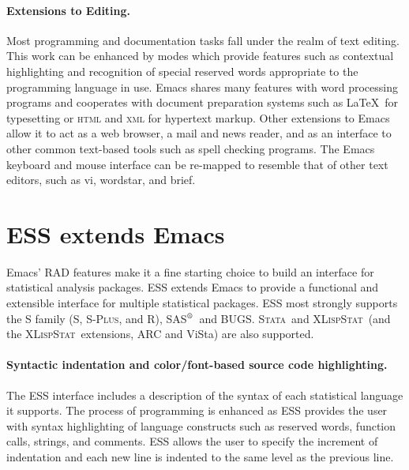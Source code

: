 \documentclass{article}
\newcommand*{\SAS}{\textsc{SAS}$^{\mbox{\scriptsize\textregistered}}$}
\newcommand*{\Splus}{\textsc{S-Plus}}
\newcommand*{\XLispStat}{\textsc{XLispStat}}
\newcommand*{\Stata}{\textsc{Stata}}
\begin{document}
\paragraph{Extensions to Editing.}
Most programming and documentation tasks fall under the realm of text
editing.  This work can be enhanced by modes which provide features such
as contextual highlighting and recognition of special reserved words
appropriate to the programming language in use.  
Emacs shares many features with word processing
programs and cooperates with document preparation systems
such as \LaTeX\ for typesetting or \textsc{html} and \textsc{xml}
for hypertext markup.
Other extensions to Emacs allow it to act as a web browser, a mail and news
reader, and as an interface to
other common text-based tools such as spell checking programs.  The
Emacs keyboard and mouse interface can be re-mapped to resemble that
of other text editors, such as vi, wordstar, and brief.


\section{ESS extends Emacs}
\label{sec:ess-extends-emacs}

Emacs' RAD features make it a fine starting choice to
build an interface for statistical analysis packages.  ESS extends
Emacs to provide a functional and extensible interface
for multiple statistical packages. 
ESS most strongly supports the S family (S, \Splus, and R), \SAS\ and BUGS.  
\Stata\ and \XLispStat\ (and the \XLispStat\ extensions, ARC and ViSta) are
also supported.

\paragraph{Syntactic indentation and color/font-based source code
  highlighting.}  The ESS interface includes a description of the
syntax of each statistical language it supports.
The process of programming is enhanced as ESS provides the user with
syntax highlighting of language constructs such as reserved words,
function calls, strings, and comments.  ESS allows the user to specify
the increment of indentation and each new line is indented
to the same level as the previous line.
\end{document}
